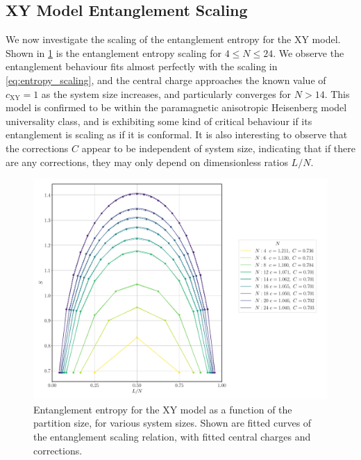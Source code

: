 \documentclass[12pt]{article}{}
\begin{document}
\subsection{XY Model Entanglement Scaling}
We now investigate the scaling of the entanglement entropy for the XY model. Shown in \cref{fig:xy_entanglement_partition} is the entanglement entropy scaling for $4 \leq N \leq 24$. We observe the entanglement behaviour fits almost perfectly with the scaling in \cref{eq:entropy_scaling}, and the central charge approaches the known value \cite{Cole2017} of $\boxed{c_{\textrm{XY}} = 1}$ as the system size increases, and particularly converges for $N>14$. This model is confirmed to be within the paramagnetic anisotropic Heisenberg model universality class, and is exhibiting some kind of critical behaviour if its entanglement is scaling as if it is conformal. It is also interesting to observe that the corrections $C$ appear to be independent of system size, indicating that if there are any corrections, they may only depend on dimensionless ratios $L/N$.
\begin{figure}[H]
  \centering
  \includegraphics[width=1\textwidth]{figures/xy/entanglement__partition__N__U__J.pdf}
  \caption{Entanglement entropy for the XY model as a function of the partition size, for various system sizes. Shown are fitted curves of the entanglement scaling relation, with fitted central charges and corrections.}
  \label{fig:xy_entanglement_partition}
\end{figure}
\end{document}
